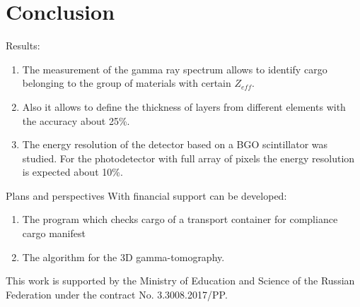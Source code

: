 \documentclass[a4paper]{panl}
\begin{document}
\section*{Conclusion}
Results:   
    \begin{enumerate}
        \item The measurement of the gamma ray spectrum allows to identify cargo belonging to the group of materials with certain $Z_{eff}$.
        \item Also it allows to define the thickness of layers from different elements with the accuracy about 25\%.
        \item The energy resolution of the detector based on a BGO scintillator was studied.  For the photodetector with full array of pixels the energy resolution is expected about 10\%.
    \end{enumerate}
Plans and perspectives
    With financial support can be developed:
    \begin{enumerate}
        \item The program which checks cargo of a transport container  for compliance cargo manifest
        \item The algorithm for the 3D gamma-tomography.
    \end{enumerate}

This work is supported by the Ministry of Education and Science of the Russian Federation under the contract No. 3.3008.2017/PP.


\end{document}

